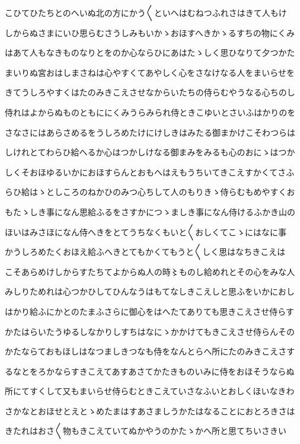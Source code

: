 \documentclass[a4paper,11pt,landscape]{ltjtarticle}
\begin{document}
こひてひたちとのへいぬ北の方にかう〱といへはむねつふれさはきて人もけ
\par\medskip
しからぬさまにいひ思らむさうしみもいかゝおほすへきかゝるすちの物にくみ
\par\medskip
はあて人もなきものなりとをのか心ならひにあはたゝしく思ひなりて夕つかた
\par\medskip
まいりぬ宮おはしまさねは心やすくてあやしく心をさなけなる人をまいらせを
\par\medskip
きてうしろやすくはたのみきこえさせなからいたちの侍らむやうなる心ちのし
\par\medskip
侍れはよからぬものともににくみうらみられ侍ときこゆいとさいふはかりのを
\par\medskip
さなさにはあらさめるをうしろめたけにけしきはみたる御まかけこそわつらは
\par\medskip
しけれとてわらひ給へるか心はつかしけなる御まみをみるも心のおにゝはつか
\par\medskip
しくそおほゆるいかにおほすらんとおもへはえもうちいてきこえすかくてさふ
\par\medskip
らひ給はゝとしころのねかひのみつ心ちして人のもりきゝ侍らむもめやすくお
\par\medskip
もたゝしき事になん思給ふるをさすかにつゝましき事になん侍けるふかき山の
\par\medskip
ほいはみさほになん侍へきをとてうちなくもいと〱おしくてこゝにはなに事
\par\medskip
かうしろめたくおほえ給ふへきとてもかくてもうと〱しく思はなちきこえは
\par\medskip
こそあらめけしからすたちてよからぬ人の時〻ものし給めれとその心をみな人
\par\medskip
みしりためれは心つかひしてひんなうはもてなしきこえしと思ふをいかにおし
\par\medskip
はかり給ふにかとのたまふさらに御心をはへたてありても思きこえさせ侍らす
\par\medskip
かたはらいたうゆるしなかりしすちはなにゝかかけてもきこえさせ侍らんその
\par\medskip
かたならておもほしはなつましきつなも侍をなんとらへ所にたのみきこえさす
\par\medskip
るなとをろかならすきこえてあすあさてかたきものいみに侍をおほそうならぬ
\par\medskip
所にてすくして又もまいらせ侍らむときこえていさなふいとおしくほいなきわ
\par\medskip
さかなとおほせとえとゝめたまはすあさましうかたはなることにおとろきさは
\par\medskip
きたれはおさ〱物もきこえていてぬかやうのかたゝかへ所と思てちいさきい
\end{document}
